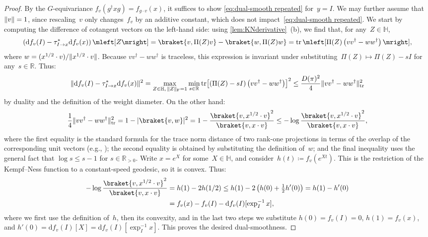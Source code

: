 \documentclass[11pt,letterpaper]{article}
\numberwithin{equation}{section}
\newcommand{\RR}{\mathbb{R}}
\newcommand{\bbH}{\mathbb{H}}
\newcommand{\diff}{\mathrm{d}}
\DeclareMathOperator{\tr}{tr}
\DeclarePairedDelimiter\abs{\lvert}{\rvert}
\DeclarePairedDelimiter\norm{\lVert}{\rVert}
\begin{document}
\begin{proof}
By the $G$-equivariance $f_v(g^\dagger xg) = f_{g\cdot v}(x)$, it suffices to show \cref{eq:dual-smooth repeated} for~$y = I$.
We may further assume that~$\norm v=1$, since rescaling~$v$ only changes~$f_v$ by an additive constant, which does not impact~\cref{eq:dual-smooth repeated}.
We start by computing the difference of cotangent vectors on the left-hand side: using \cref{lem:KNderivative}~(b), we find that, for any~$Z \in \bbH$,
\begin{align*}
    \left( \diff f_v(I) - \tau^{\ast}_{I \to x}\diff f_v(x) \right)\mleft[Z\mright]
=   \braket{v, \Pi(Z) v} - \braket{w, \Pi(Z) w}
=   \tr\mleft[ \Pi(Z) \left( v v^\dagger - w w^\dagger \right) \mright],
\end{align*}
where $w = (x^{1/2} \cdot v) / \norm{x^{1/2} \cdot v}$.
Because $v v^\dagger - w w^\dagger$ is traceless, this expression is invariant under substituting~$\Pi(Z) \mapsto \Pi(Z) - sI$ for any~$s\in\RR$.
Thus:
\begin{align*}
    \norm{ \diff f_v(I) - \tau^{\ast}_{I \to x}\diff f_v(x) }^2
= \max_{Z \in \bbH, \, \norm Z_{\mathrm F}=1} \min_{s \in \RR} \tr\mleft[ \left( \Pi(Z) - s I \right) \left( v v^\dagger - w w^\dagger \right) \mright]^2
\leq \frac {D(\pi)^2} 4 \norm{v v^\dagger - w w^\dagger}_{\tr}^2
\end{align*}
by duality and the definition of the weight diameter.
On the other hand:
\begin{align*}
    \frac14 \norm{v v^\dagger - w w^\dagger}_{\tr}^2
=   1 - \abs{\braket{v,w}}^2
=   1 - \frac {\braket{v, x^{1/2} \cdot v}^2} {\braket{v, x \cdot v}}
\leq - \log \frac {\braket{v, x^{1/2} \cdot v}^2} {\braket{v, x \cdot v}},
\end{align*}
where the first equality is the standard formula for the trace norm distance of two rank-one projections in terms of the overlap of the corresponding unit vectors (e.g., \cite[(1.186)]{watrous});
the second equality is obtained by substituting the definition of~$w$;
and the final inequality uses the general fact that $\log s \leq s - 1$ for $s\in\RR_{>0}$.
Write $x = e^X$ for some~$X \in \bbH$, and consider~$h(t) \coloneqq f_v(e^{Xt})$.
This is the restriction of the Kempf--Ness function to a constant-speed geodesic, so it is convex.
Thus:
\begin{align*}
  - \log \frac {\braket{v, x^{1/2} \cdot v}^2} {\braket{v, x \cdot v}}
&= h(1) - 2 h(1/2)
\leq h(1) - 2 \left( h(0) + \tfrac12 h'(0) \right)
= h(1) - h'(0) \\
&= f_v(x) - f_v(I) - \diff f_v(I)[\exp_I^{-1}x],
\end{align*}
where we first use the definition of~$h$, then its convexity, and in the last two steps we substitute
$h(0)=f_v(I)=0$,
$h(1) = f_v(x)$,
and $h'(0) = \diff f_v(I)[X] = \diff f_v(I)[\exp_I^{-1}x]$.
This proves the desired dual-smoothness.
\end{proof}
\end{document}
